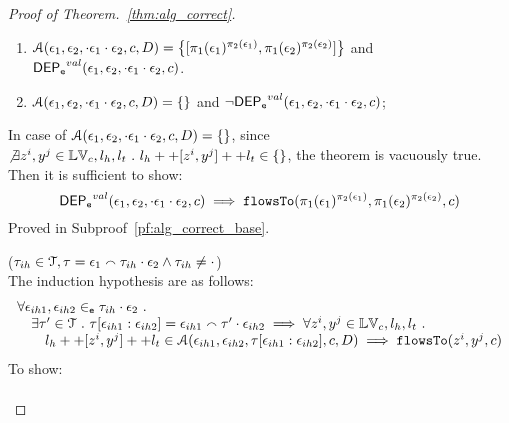 \begin{proof}[Proof of Theorem.~\ref{thm:alg_correct}]
\begin{case}
\begin{enumerate}
  \item $\mathcal{A}(\event_1, \event_2, \cdot \event_1 \cdot \event_2, c, D) = 
  \left\{[\pi_1(\event_1)^{\pi_2(\event_1)}, \pi_1(\event_2)^{\pi_2(\event_2)}] \right \}$ 
  and $\mathsf{DEP_{\mathtt{e}}}^{val}(\mathtt{\epsilon}_1, \mathtt{\epsilon}_2, \cdot  \mathtt{\epsilon}_1 \cdot \mathtt{\epsilon}_2, c)$.
  \item  $\mathcal{A}(\mathtt{\epsilon}_1, \mathtt{\epsilon}_2, \cdot \mathtt{\epsilon}_1 \cdot \mathtt{\epsilon}_2, c, D) = \{\}$ 
  and $\neg \mathsf{DEP_{\mathtt{e}}}^{val}(\mathtt{\epsilon}_1, \mathtt{\epsilon}_2, \cdot  \mathtt{\epsilon}_1 \cdot \mathtt{\epsilon}_2, c)$;
\end{enumerate}
%
In case of $\mathcal{A}(\mathtt{\epsilon}_1, \mathtt{\epsilon}_2, \cdot \mathtt{\epsilon}_1 \cdot \mathtt{\epsilon}_2, c, D) = \{\}$,
since $\not\exists  z^i, y^j \in \mathbb{LV}_c, l_h, l_t ~.~ l_h ++ [z^i, y^j] ++ l_t \in \{\}$, the theorem is vacuously true.
%
\\
Then it is sufficient to show: 
\[
  \mathsf{DEP_{\mathtt{e}}}^{val}(\mathtt{\epsilon}_1, \mathtt{\epsilon}_2, \cdot \mathtt{\epsilon}_1 \cdot \mathtt{\epsilon}_2, c) \implies \mathtt{flowsTo}(\pi_1(\mathtt{\epsilon}_1)^{\pi_2(\mathtt{\epsilon}_1)}, \pi_1(\mathtt{\epsilon}_2)^{\pi_2(\mathtt{\epsilon}_2)}, c)
\]
%
Proved in Subproof~\ref{pf:alg_correct_base}.

%
\end{case}
%
\begin{case}
($\mathtt{\tau}_{ih} \in \mathcal{T}, \mathtt{\tau} = \mathtt{\epsilon}_1 \smallfrown \mathtt{\tau}_{ih} \cdot \mathtt{\epsilon}_2 \land \mathtt{\tau}_{ih} \neq \cdot$)
\\
The induction hypothesis are as follows:
%
\[
\begin{array}{l}
  \forall \mathtt{\epsilon}_{ih1}, \mathtt{\epsilon}_{ih2} \in_{\mathtt{e}} \mathtt{\tau}_{ih} \cdot \mathtt{\epsilon}_2 ~.~
   \\ \quad
   \exists \mathtt{\tau}' \in \mathcal{T} ~.~ 
   \mathtt{\tau}[\mathtt{\epsilon}_{ih1}:\mathtt{\epsilon}_{ih2}] = \mathtt{\epsilon}_{ih1} \smallfrown \mathtt{\tau}' \cdot \mathtt{\epsilon}_{ih2}
   \implies 
   \forall z^i, y^j \in \mathbb{LV}_c, l_h, l_t ~.~ 
    \\ \qquad 
   l_h ++ [z^i, y^j] ++ l_t  \in \mathcal{A}(\mathtt{\epsilon}_{ih1}, \mathtt{\epsilon}_{ih2}, \mathtt{\tau}[\mathtt{\epsilon}_{ih1}:\mathtt{\epsilon}_{ih2}], c, D)
   \implies \mathtt{flowsTo}(z^i, y^j, c)
\end{array}
\]
%
To show:
\[
\begin{array}{l}

\end{array}\]
\end{case}
\end{proof}
